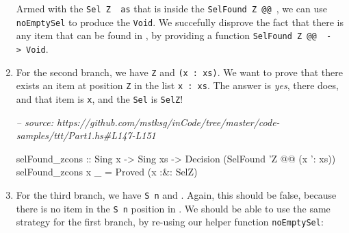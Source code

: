 \documentclass[]{article}
\newenvironment{Shaded}{}{}
\newcommand{\CommentTok}[1]{\textcolor[rgb]{0.38,0.63,0.69}{\textit{#1}}}
\newcommand{\DataTypeTok}[1]{\textcolor[rgb]{0.56,0.13,0.00}{#1}}
\newcommand{\FunctionTok}[1]{\textcolor[rgb]{0.02,0.16,0.49}{#1}}
\newcommand{\NormalTok}[1]{#1}
\newcommand{\OtherTok}[1]{\textcolor[rgb]{0.00,0.44,0.13}{#1}}
\begin{document}
\begin{enumerate}
\begin{Shaded}
\end{Shaded}

  Armed with the \texttt{Sel\ \textquotesingle{}Z\ \textquotesingle{}{[}{]}\ as}
  that is inside the
  \texttt{SelFound\ \textquotesingle{}Z\ @@\ \textquotesingle{}{[}{]}}, we can
  use \texttt{noEmptySel} to produce the \texttt{Void}. We succefully disprove
  the fact that there is any item that can be found in
  \texttt{\textquotesingle{}{[}{]}}, by providing a function
  \texttt{SelFound\ \textquotesingle{}Z\ @@\ \textquotesingle{}{[}{]}\ -\textgreater{}\ Void}.
\item
  For the second branch, we have \texttt{\textquotesingle{}Z} and
  \texttt{(x\ \textquotesingle{}:\ xs)}. We want to prove that there exists an
  item at position \texttt{\textquotesingle{}Z} in the list
  \texttt{x\ \textquotesingle{}:\ xs}. The answer is \emph{yes}, there does, and
  that item is \texttt{x}, and the \texttt{Sel} is \texttt{SelZ}!

\begin{Shaded}
\begin{Highlighting}[]
\CommentTok{-- source: https://github.com/mstksg/inCode/tree/master/code-samples/ttt/Part1.hs#L147-L151}

\NormalTok{selFound_zcons}
\OtherTok{    ::} \DataTypeTok{Sing}\NormalTok{ x}
    \OtherTok{->} \DataTypeTok{Sing}\NormalTok{ xs}
    \OtherTok{->} \DataTypeTok{Decision}\NormalTok{ (}\DataTypeTok{SelFound}\NormalTok{ '}\DataTypeTok{Z} \FunctionTok{@@}\NormalTok{ (x '}\FunctionTok{:}\NormalTok{ xs))}
\NormalTok{selFound_zcons x _ }\FunctionTok{=} \DataTypeTok{Proved}\NormalTok{ (x }\FunctionTok{:&:} \DataTypeTok{SelZ}\NormalTok{)}
\end{Highlighting}
\end{Shaded}
\item
  For the third branch, we have \texttt{\textquotesingle{}S\ n} and
  \texttt{\textquotesingle{}{[}{]}}. Again, this should be false, because there
  is no item in the \texttt{\textquotesingle{}S\ n} position in
  \texttt{\textquotesingle{}{[}{]}}. We should be able to use the same strategy
  for the first branch, by re-using our helper function \texttt{noEmptySel}:


\end{enumerate}
\end{document}
